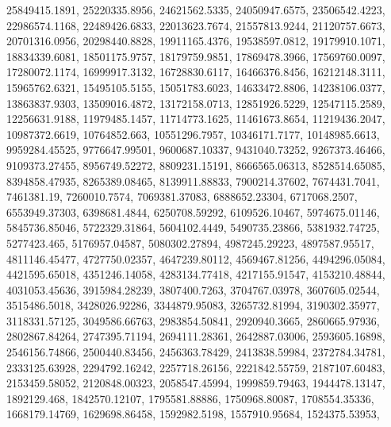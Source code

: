 \begin{code}
\begin{hide}
{     25849415.1891,     25220335.8956,     24621562.5335,
     24050947.6575,     23506542.4223,     22986574.1168,
     22489426.6833,     22013623.7674,     21557813.9244,
     21120757.6673,     20701316.0956,     20298440.8828,
     19911165.4376,     19538597.0812,     19179910.1071,
     18834339.6081,     18501175.9757,     18179759.9851,
     17869478.3966,     17569760.0097,     17280072.1174,
     16999917.3132,     16728830.6117,     16466376.8456,
     16212148.3111,     15965762.6321,     15495105.5155,
     15051783.6023,     14633472.8806,     14238106.0377,
     13863837.9303,     13509016.4872,     13172158.0713,
     12851926.5229,     12547115.2589,     12256631.9188,
     11979485.1457,     11714773.1625,     11461673.8654,
     11219436.2047,     10987372.6619,      10764852.663,
     10551296.7957,     10346171.7177,     10148985.6613,
     9959284.45525,     9776647.99501,     9600687.10337,
     9431040.73252,     9267373.46466,     9109373.27455,
     8956749.52272,     8809231.15191,     8666565.06313,
     8528514.65085,     8394858.47935,     8265389.08465,
     8139911.88833,     7900214.37602,      7674431.7041,
        7461381.19,      7260010.7574,     7069381.37083,
     6888652.23304,      6717068.2507,     6553949.37303,
      6398681.4844,     6250708.59292,     6109526.10467,
     5974675.01146,     5845736.85046,     5722329.31864,
      5604102.4449,     5490735.23866,     5381932.74725,
       5277423.465,     5176957.04587,     5080302.27894,
     4987245.29223,     4897587.95517,     4811146.45477,
     4727750.02357,     4647239.80112,     4569467.81256,
     4494296.05084,     4421595.65018,     4351246.14058,
     4283134.77418,     4217155.91547,     4153210.48844,
     4031053.45636,     3915984.28239,      3807400.7263,
     3704767.03978,     3607605.02544,      3515486.5018,
     3428026.92286,     3344879.95083,     3265732.81994,
     3190302.35977,     3118331.57125,     3049586.66763,
     2983854.50841,      2920940.3665,     2860665.97936,
     2802867.84264,     2747395.71194,     2694111.28361,
     2642887.03006,     2593605.16898,     2546156.74866,
     2500440.83456,     2456363.78429,     2413838.59984,
     2372784.34781,     2333125.63928,     2294792.16242,
     2257718.26156,     2221842.55759,     2187107.60483,
     2153459.58052,     2120848.00323,     2058547.45994,
     1999859.79463,     1944478.13147,       1892129.468,
     1842570.12107,     1795581.88886,     1750968.80087,
     1708554.35336,     1668179.14769,     1629698.86458,
      1592982.5198,     1557910.95684,     1524375.53953,
}
\end{hide}
\end{code}
